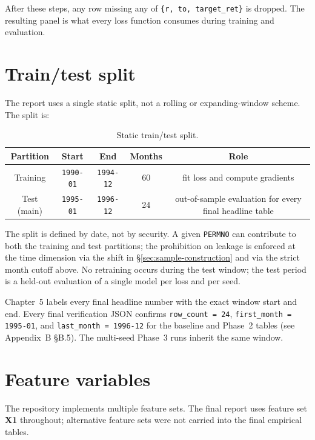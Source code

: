 After these steps, any row missing any of \texttt{\{r, to, target\_ret\}} is dropped. The resulting panel is what every loss function consumes during training and evaluation.

\section{Train/test split}\label{sec:train-test-split}

The report uses a single static split, not a rolling or expanding-window scheme. The split is:

\begin{table}[H]
\centering
\caption{Static train/test split.}\label{tab:train-test-split}
\begin{tabular}{ccccc}\toprule
Partition & Start & End & Months & Role \\\midrule
Training & \texttt{1990-01} & \texttt{1994-12} & 60 & fit loss and compute gradients \\
Test (main) & \texttt{1995-01} & \texttt{1996-12} & 24 & out-of-sample evaluation for every final headline table \\
\bottomrule
\end{tabular}
\end{table}

The split is defined by date, not by security. A given \texttt{PERMNO} can contribute to both the training and test partitions; the prohibition on leakage is enforced at the time dimension via the shift in \S\ref{sec:sample-construction} and via the strict month cutoff above. No retraining occurs during the test window; the test period is a held-out evaluation of a single model per loss and per seed.

Chapter~5 labels every final headline number with the exact window start and end. Every final verification JSON confirms \texttt{row\_count = 24}, \texttt{first\_month = 1995-01}, and \texttt{last\_month = 1996-12} for the baseline and Phase~2 tables (see Appendix~B \S B.5). The multi-seed Phase~3 runs inherit the same window.

\section{Feature variables}\label{sec:feature-variables}

The repository implements multiple feature sets. The final report uses feature set \textbf{X1} throughout; alternative feature sets were not carried into the final empirical tables.

